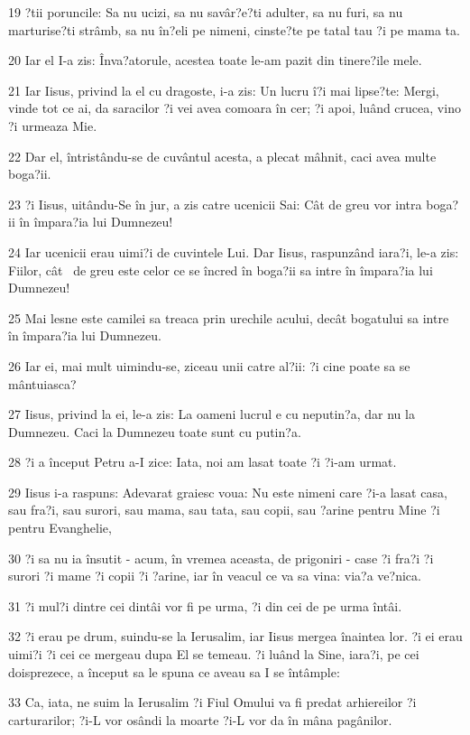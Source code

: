 \par 19 ?tii poruncile: Sa nu ucizi, sa nu savâr?e?ti adulter, sa nu furi, sa nu marturise?ti strâmb, sa nu în?eli pe nimeni, cinste?te pe tatal tau ?i pe mama ta.
\par 20 Iar el I-a zis: Înva?atorule, acestea toate le-am pazit din tinere?ile mele.
\par 21 Iar Iisus, privind la el cu dragoste, i-a zis: Un lucru î?i mai lipse?te: Mergi, vinde tot ce ai, da saracilor ?i vei avea comoara în cer; ?i apoi, luând crucea, vino ?i urmeaza Mie.
\par 22 Dar el, întristându-se de cuvântul acesta, a plecat mâhnit, caci avea multe boga?ii.
\par 23 ?i Iisus, uitându-Se în jur, a zis catre ucenicii Sai: Cât de greu vor intra boga?ii în împara?ia lui Dumnezeu!
\par 24 Iar ucenicii erau uimi?i de cuvintele Lui. Dar Iisus, raspunzând iara?i, le-a zis: Fiilor, cât  de greu este celor ce se încred în boga?ii sa intre în împara?ia lui Dumnezeu!
\par 25 Mai lesne este camilei sa treaca prin urechile acului, decât bogatului sa intre în împara?ia lui Dumnezeu.
\par 26 Iar ei, mai mult uimindu-se, ziceau unii catre al?ii: ?i cine poate sa se mântuiasca?
\par 27 Iisus, privind la ei, le-a zis: La oameni lucrul e cu neputin?a, dar nu la Dumnezeu. Caci la Dumnezeu toate sunt cu putin?a.
\par 28 ?i a început Petru a-I zice: Iata, noi am lasat toate ?i ?i-am urmat.
\par 29 Iisus i-a raspuns: Adevarat graiesc voua: Nu este nimeni care ?i-a lasat casa, sau fra?i, sau surori, sau mama, sau tata, sau copii, sau ?arine pentru Mine ?i pentru Evanghelie,
\par 30 ?i sa nu ia însutit - acum, în vremea aceasta, de prigoniri - case ?i fra?i ?i surori ?i mame ?i copii ?i ?arine, iar în veacul ce va sa vina: via?a ve?nica.
\par 31 ?i mul?i dintre cei dintâi vor fi pe urma, ?i din cei de pe urma întâi.
\par 32 ?i erau pe drum, suindu-se la Ierusalim, iar Iisus mergea înaintea lor. ?i ei erau uimi?i ?i cei ce mergeau dupa El se temeau. ?i luând la Sine, iara?i, pe cei doisprezece, a început sa le spuna ce aveau sa I se întâmple:
\par 33 Ca, iata, ne suim la Ierusalim ?i Fiul Omului va fi predat arhiereilor ?i carturarilor; ?i-L vor osândi la moarte ?i-L vor da în mâna pagânilor.
